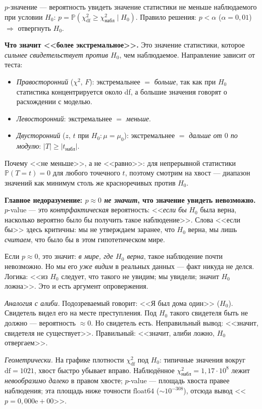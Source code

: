 \documentclass[12pt,a4paper]{extarticle}
\begin{document}
{$p$-значение --- вероятность увидеть значение статистики не меньше
наблюдаемого при условии $H_0$:
$p=\mathbb{P}(\chi^2_\mathrm{df}\ge \chi^2_\mathrm{набл}\mid H_0)$.
Правило решения: $p<\alpha$ ($\alpha=0{,}01$) $\Rightarrow$ отвергнуть $H_0$.

\medskip
\textbf{Что значит <<более экстремальное>>.} Это значение статистики,
которое \emph{сильнее свидетельствует против $H_0$}, чем наблюдаемое.
Направление зависит от теста:
\begin{itemize}\setlength{\itemsep}{0.1em}
  \item \emph{Правосторонний} ($\chi^2$, $F$): экстремальнее $=$
        \emph{больше}, так как при $H_0$ статистика концентрируется около
        df, а большие значения говорят о расхождении с моделью.
  \item \emph{Левосторонний}: экстремальнее $=$ \emph{меньше}.
  \item \emph{Двусторонний} ($z$, $t$ при $H_0\!:\mu=\mu_0$): экстремальнее
        $=$ \emph{дальше от $0$ по модулю}: $|T|\ge|t_\mathrm{набл}|$.
\end{itemize}
Почему <<не меньше>>, а не <<равно>>: для непрерывной статистики
$\mathbb{P}(T=t)=0$ для любого точечного $t$, поэтому смотрим на хвост ---
диапазон значений как минимум столь же красноречивых против $H_0$.

\medskip
\textbf{Главное недоразумение: $p\!\approx\!0$ \emph{не значит},
что значение увидеть невозможно.} $p$-value --- это \emph{контрфактическая}
вероятность: <<\emph{если бы} $H_0$ была верна, насколько вероятно было бы
получить такое наблюдение>>. Слова <<если бы>> здесь критичны: мы не
утверждаем заранее, что $H_0$ верна, мы лишь \emph{считаем}, что было бы в
этом гипотетическом мире.

Если $p\!\approx\!0$, это значит: \emph{в мире, где $H_0$ верна}, такое
наблюдение почти невозможно. Но мы его \emph{уже видим} в реальных
данных --- факт никуда не делся. Логика: <<из $H_0$ следует, что такого не
увидим; мы увидели; значит $H_0$ ложна>>. Это и есть аргумент опровержения.

\emph{Аналогия с алиби.} Подозреваемый говорит: <<Я был дома один>>
($H_0$). Свидетель видел его на месте преступления. Под $H_0$ такого
свидетеля быть не должно --- вероятность $\approx\!0$. Но свидетель есть.
Неправильный вывод: <<значит, свидетеля не существует>>. Правильный:
<<значит, алиби ложно, $H_0$ отвергаем>>.

\emph{Геометрически.} На графике плотности $\chi^2_\mathrm{df}$ под $H_0$:
типичные значения вокруг $\mathrm{df}\!=\!1021$, хвост быстро убывает
вправо. Наблюдённое $\chi^2_\mathrm{набл}\!=\!1{,}17\!\cdot\!10^8$ лежит
\emph{невообразимо далеко} в правом хвосте; $p$-value --- площадь хвоста
правее наблюдения; эта площадь ниже точности $\mathrm{float64}$
($\sim\!10^{-308}$), отсюда вывод <<$p=0{,}000\mathrm{e}{+}00$>>.

}
\end{document}
